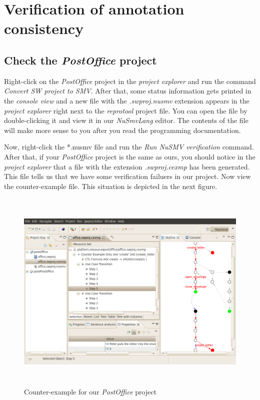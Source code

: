 \section{Verification of annotation consistency}

\subsection{Check the \emph{PostOffice} project}
Right-click on the \emph{PostOffice} project in the \emph{project explorer} and run the command \emph{Convert SW project to SMV}.
After that, some status information gets printed in the \emph{console view} and a new file with the \emph{.swproj.nusmv} extension
appears in the \emph{project explorer} right next to the \emph{reprotool} project file. You can open the file by double-clicking it
and view it in our \emph{NuSmvLang} editor. The contents of the file will make more sense to you after you read the programming
documentation.

Now, right-click the *.nusmv file and run the \emph{Run NuSMV verification} command. After that, if your \emph{PostOffice} project is
the same as ours, you should notice in the \emph{project explorer} that a file with the extension \emph{.swproj.cexmp} has been
generated. This file tells us that we have some verification failuers in our project. Now view the counter-example file. This situation
is depicted in the next figure.

\begin{figure}[ht]
  \centering
  \includegraphics[height=280pt]{images/reprotoolVerify}
  \caption{Counter-example for our \emph{PostOffice} project}
  \label{fig:reprotoolVerify}
\end{figure}

